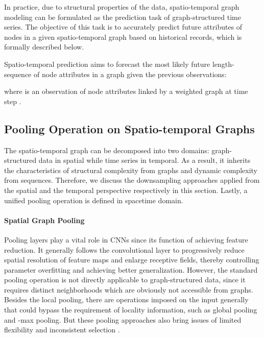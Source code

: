 \documentclass[sigconf,screen]{acmart}
\begin{document}
In practice, due to structural properties of the data, spatio-temporal graph modeling can be formulated as the prediction task of graph-structured time series. The objective of this task is to accurately predict future attributes of nodes in a given spatio-temporal graph based on historical records, which is formally described below.

\begin{definition} 
Spatio-temporal prediction aims to forecast the most likely future length- sequence of node attributes in a graph given the previous  observations:

where  is an observation of node attributes linked by a weighted graph  at time step .
\end{definition}

\subsection{Pooling Operation on Spatio-temporal Graphs}
The spatio-temporal graph can be decomposed into two domains: graph-structured data in spatial while time series in temporal. As a result, it inherits the characteristics of structural complexity from graphs and dynamic complexity from sequences. Therefore, we discuss the downsampling approaches applied from the spatial and the temporal perspective respectively in this section. Lastly, a unified pooling operation is defined in spacetime domain.

\paragraph{Spatial Graph Pooling}
Pooling layers play a vital role in CNNs since its function of achieving feature reduction. It generally follows the convolutional layer to progressively reduce spatial resolution of feature maps and enlarge receptive fields, thereby controlling parameter overfitting and achieving better generalization. However, the standard pooling operation is not directly applicable to graph-structured data, since it requires distinct neighborhoods which are obviously not accessible from graphs. Besides the local pooling, there are operations imposed on the input generally that could bypass the requirement of locality information, such as global pooling and -max pooling. But these pooling approaches also bring issues of limited flexibility and inconsistent selection \cite{gao2019graph}. 
\end{document}
